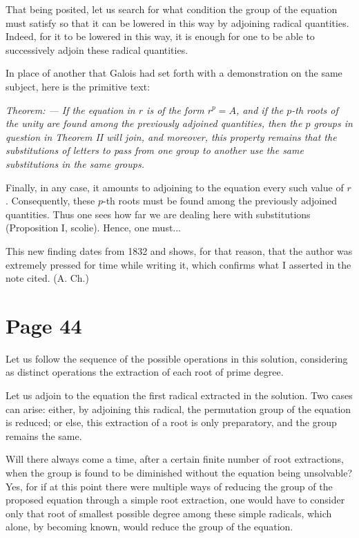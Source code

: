 \documentclass{article}
\begin{document}
That being posited, let us search for what condition the group of the equation must satisfy so that it can be lowered in this way by adjoining radical quantities. Indeed, for it to be lowered in this way, it is enough for one to be able to successively adjoin these radical quantities.

In place of another that Galois had set forth with a demonstration on the same subject, here is the primitive text:

\emph{Theorem: --- If the equation in $r$ is of the form $r^p = A$, and if the $p$-th roots of the unity are found among the previously adjoined quantities, then the $p$ groups in question in Theorem II will join, and moreover, this property remains that the substitutions of letters to pass from one group to another use the same substitutions in the same groups.}

Finally, in any case, it amounts to adjoining to the equation every such value of $r$. Consequently, these $p$-th roots must be found among the previously adjoined quantities. Thus one sees how far we are dealing here with substitutions (Proposition I, scolie). Hence, one must...

This new finding dates from 1832 and shows, for that reason, that the author was extremely pressed for time while writing it, which confirms what I asserted in the note cited. (A. Ch.)

\section*{Page 44}

Let us follow the sequence of the possible operations in this solution, considering as distinct operations the extraction of each root of prime degree.

Let us adjoin to the equation the first radical extracted in the solution. Two cases can arise: either, by adjoining this radical, the permutation group of the equation is reduced; or else, this extraction of a root is only preparatory, and the group remains the same.

Will there always come a time, after a certain finite number of root extractions, when the group is found to be diminished without the equation being unsolvable? Yes, for if at this point there were multiple ways of reducing the group of the proposed equation through a simple root extraction, one would have to consider only that root of smallest possible degree among these simple radicals, which alone, by becoming known, would reduce the group of the equation.
\end{document}
